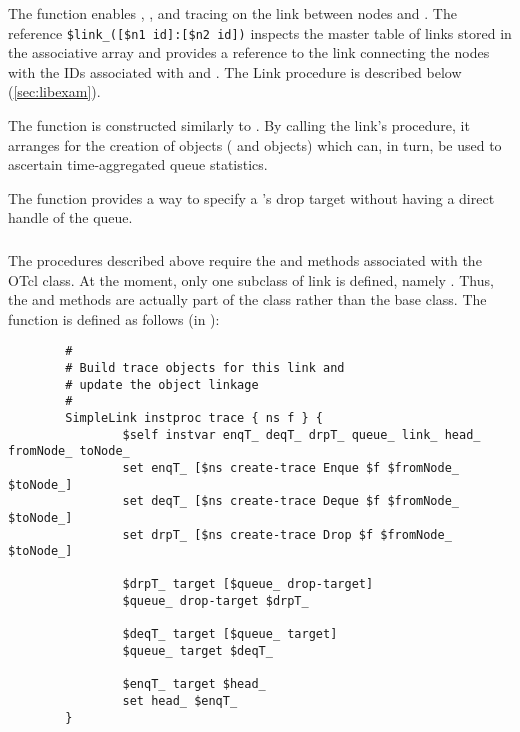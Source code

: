 The  function enables
, , and  tracing on the link
between nodes  and .
The reference \verb!$link_([$n1 id]:[$n2 id])! inspects the master
table of links stored in the associative array  and provides
a reference to the link connecting the nodes with the IDs associated
with  and .
The Link  procedure is described below (\ref{sec:libexam}).

The  function is constructed similarly to
.
By calling the link's  procedure, it arranges
for the creation of objects ( and 
objects) which can, in turn, be used to ascertain time-aggregated
queue statistics.

The  function provides a way to specify a
's drop target without having a direct handle of
the queue.

\subsubsection{}

The  procedures described above require the 
and  methods associated with the OTcl  class.
At the moment, only one subclass of link is defined, namely
.  Thus, the  and 
methods are actually part of the  class rather than
the  base class.
The  function is defined as follows (in ):
\begin{small}
\begin{verbatim}
        #
        # Build trace objects for this link and
        # update the object linkage
        #
        SimpleLink instproc trace { ns f } {
                $self instvar enqT_ deqT_ drpT_ queue_ link_ head_ fromNode_ toNode_
                set enqT_ [$ns create-trace Enque $f $fromNode_ $toNode_]
                set deqT_ [$ns create-trace Deque $f $fromNode_ $toNode_]
                set drpT_ [$ns create-trace Drop $f $fromNode_ $toNode_]

                $drpT_ target [$queue_ drop-target]
                $queue_ drop-target $drpT_

                $deqT_ target [$queue_ target]
                $queue_ target $deqT_

                $enqT_ target $head_
                set head_ $enqT_
        }
\end{verbatim}
\end{small}

